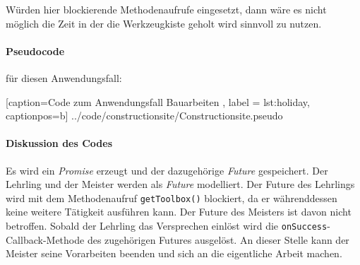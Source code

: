 Würden hier blockierende Methodenaufrufe eingesetzt, dann wäre es nicht
möglich die Zeit in der die Werkzeugkiste geholt wird sinnvoll zu
nutzen.

\paragraph{Pseudocode} für diesen Anwendungsfall:


    [caption={Code zum Anwendungsfall \glqq Bauarbeiten\grqq{} },
       label = lst:holiday,
       captionpos=b]
 {../code/constructionsite/Constructionsite.pseudo}

\paragraph{Diskussion des Codes}

Es wird ein \emph{Promise} erzeugt und der dazugehörige \emph{Future}
gespeichert. Der Lehrling und der Meister werden als \emph{Future}
modelliert. Der Future des Lehrlings wird mit dem Methodenaufruf
\texttt{getToolbox()} blockiert, da er währenddessen keine weitere
Tätigkeit ausführen kann. Der Future des Meisters ist davon nicht
betroffen. Sobald der Lehrling das Versprechen einlöst wird die
\texttt{onSuccess}-Callback-Methode des zugehörigen Futures ausgelöst.
An dieser Stelle kann der Meister seine Vorarbeiten beenden und sich
an die eigentliche Arbeit machen.
